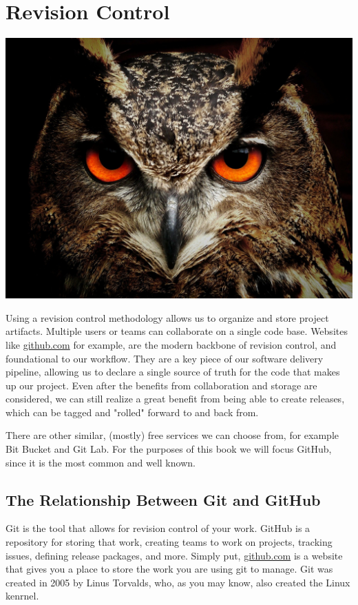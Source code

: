 \chapter{Revision Control}
\includegraphics[scale=0.20]{images/owl-50267_1920.jpg}

\justify{}
Using a revision control methodology allows us to organize and store project artifacts. Multiple users or
teams can collaborate on a single code base. Websites like \href{https://github.com}{github.com} for example, are the modern
backbone of revision control, and foundational to our workflow. They are a key piece of our software delivery pipeline,
allowing us to declare a single source of truth for the code that makes up our project. Even after the benefits from collaboration and 
storage are considered, we can still realize a great benefit from being able to create releases, which can be tagged and "rolled"
forward to and back from.

\justify{}
There are other similar, (mostly) free services we can choose from, for example Bit Bucket and Git
Lab. For the purposes of this book we will focus GitHub, since it is the most common and well known.

\section{The Relationship Between Git and GitHub}

\justify{}
Git is the tool that allows for revision control of your work. GitHub is a repository for storing that work, creating
teams to work on projects, tracking issues, defining release packages, and more. Simply put, \href{github.com}{github.com}
is a website that gives you a place to store the work you are using git to manage. Git was created in 2005 by
Linus Torvalds, who, as you may know, also created the Linux kenrnel.

